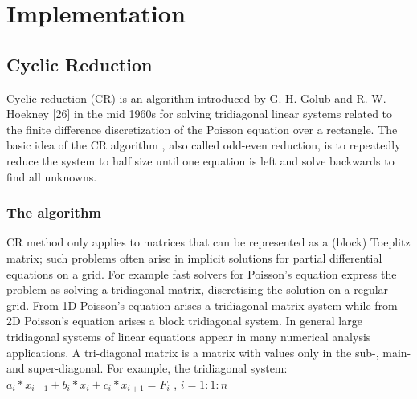 \chapter{Implementation}

\section{Cyclic Reduction}
Cyclic reduction (CR) is an algorithm introduced by G. H. Golub and R. W. Hoekney [26] in the mid 1960s for solving tridiagonal linear systems related to the finite difference discretization of the Poisson equation over a rectangle. 
The basic idea of the CR algorithm , also called odd-even reduction, is to repeatedly reduce the system to half size until one equation is left and solve backwards to find all unknowns. 
\subsection{The algorithm}
CR method only applies to matrices that can be represented as a (block) Toeplitz matrix; such problems often arise in implicit solutions for partial differential equations on a grid. For example fast solvers for Poisson's equation express the problem as solving a tridiagonal matrix, discretising the solution on a regular grid. From 1D Poisson’s equation arises a tridiagonal matrix system while from 2D Poisson’s equation arises a block tridiagonal system.
In general large tridiagonal systems of linear equations appear in many numerical analysis applications. A tri-diagonal matrix is a matrix with values only in the sub-, main- and super-diagonal.
For example, the tridiagonal system:\\
$a_i*x_{i-1} + b_i*x_i+c_i*x_{i+1} = F_{i}$  , \hspace*{2cm} $ i=1:1:n$\\

